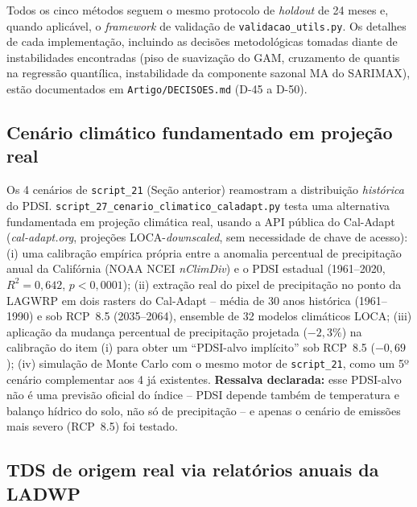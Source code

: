 Todos os cinco métodos seguem o mesmo protocolo de \textit{holdout} de 24 meses e, quando aplicável, o \textit{framework} de validação de \texttt{validacao\_utils.py}. Os detalhes de cada implementação, incluindo as decisões metodológicas tomadas diante de instabilidades encontradas (piso de suavização do GAM, cruzamento de quantis na regressão quantílica, instabilidade da componente sazonal MA do SARIMAX), estão documentados em \texttt{Artigo/DECISOES.md} (D-45 a D-50).

\subsection{Cenário climático fundamentado em projeção real}

Os 4 cenários de \texttt{script\_21} (Seção anterior) reamostram a distribuição \textit{histórica} do PDSI. \texttt{script\_27\_cenario\_climatico\_caladapt.py} testa uma alternativa fundamentada em projeção climática real, usando a API pública do Cal-Adapt (\textit{cal-adapt.org}, projeções LOCA-\textit{downscaled}, sem necessidade de chave de acesso): (i) uma calibração empírica própria entre a anomalia percentual de precipitação anual da Califórnia (NOAA NCEI \textit{nClimDiv}) e o PDSI estadual (1961--2020, $R^2=0{,}642$, $p<0{,}0001$); (ii) extração real do pixel de precipitação no ponto da LAGWRP em dois rasters do Cal-Adapt -- média de 30 anos histórica (1961--1990) e sob RCP~8.5 (2035--2064), ensemble de 32 modelos climáticos LOCA; (iii) aplicação da mudança percentual de precipitação projetada ($-2{,}3\%$) na calibração do item (i) para obter um ``PDSI-alvo implícito'' sob RCP~8.5 ($-0{,}69$); (iv) simulação de Monte Carlo com o mesmo motor de \texttt{script\_21}, como um 5º cenário complementar aos 4 já existentes. \textbf{Ressalva declarada:} esse PDSI-alvo não é uma previsão oficial do índice -- PDSI depende também de temperatura e balanço hídrico do solo, não só de precipitação -- e apenas o cenário de emissões mais severo (RCP~8.5) foi testado.

\subsection{TDS de origem real via relatórios anuais da LADWP}

